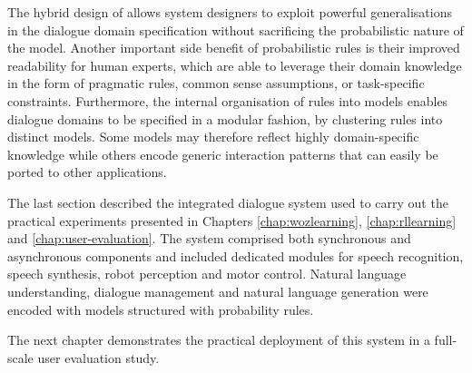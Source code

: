 The hybrid design  of \opendial{} allows system designers to exploit powerful generalisations in the dialogue domain specification without sacrificing the probabilistic nature of the model. Another important side benefit of probabilistic rules is their improved readability for human experts, which are able to leverage their domain knowledge in the form of pragmatic rules, common sense assumptions, or task-specific constraints. Furthermore, the internal organisation of rules into models enables dialogue domains to be specified in a modular fashion, by clustering rules into distinct models.  Some models may therefore reflect highly domain-specific knowledge while others encode generic interaction patterns that can easily be ported to other applications.  

The last section described the integrated dialogue system used to carry out the practical experiments presented in Chapters \ref{chap:wozlearning}, \ref{chap:rllearning} and \ref{chap:user-evaluation}.  The system comprised both synchronous and asynchronous components and included dedicated modules for speech recognition, speech synthesis, robot perception and motor control.  Natural language understanding, dialogue management and natural language generation were encoded with models structured with probability rules. 

The next chapter demonstrates the practical deployment of this system in a full-scale user evaluation study. 